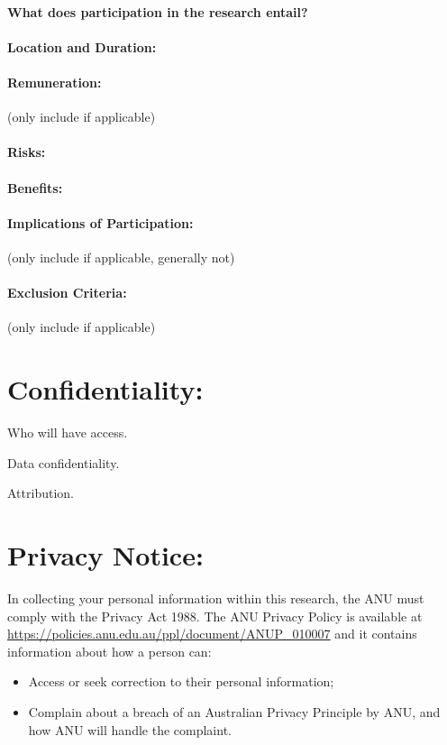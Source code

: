 \documentclass[11pt, a4paper, oneside]{article}
\begin{document}
\paragraph{What does participation in the research entail?}

\paragraph{Location and Duration:}

\paragraph{Remuneration:} (only include if applicable)

\paragraph{Risks:}

\paragraph{Benefits:}

\paragraph{Implications of Participation:} (only include if applicable, generally not)

\paragraph{Exclusion Criteria:} (only include if applicable)



\section{Confidentiality:}

Who will have access.

Data confidentiality.

Attribution.



\section{Privacy Notice:}

In collecting your personal information within this research, the ANU must comply with the Privacy Act 1988. The ANU Privacy Policy is available at \url{https://policies.anu.edu.au/ppl/document/ANUP_010007} and it contains information about how a person can:
\begin{itemize}
    \item Access or seek correction to their personal information;
    \item Complain about a breach of an Australian Privacy Principle by ANU, and how ANU will handle the complaint.
\end{itemize}
\end{document}
